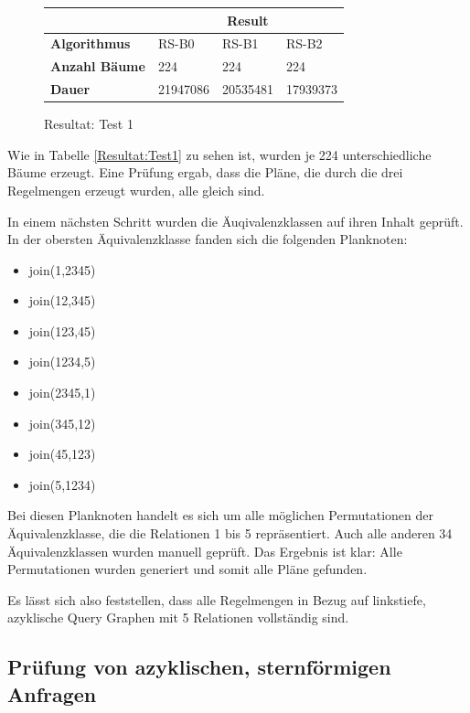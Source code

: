 \begin{figure}[ht]
\centering

\begin{tabular}{|l|l|l|l|}
\hline
                         & \multicolumn{3}{c|}{{\bf Result}} \\ \hline
{\bf Algorithmus}        & RS-B0     & RS-B1     & RS-B2     \\ \hline
{\bf Anzahl Bäume}       & 224       & 224       & 224       \\ \hline
{\bf Dauer}              & 21947086  & 20535481  & 17939373  \\ \hline
\end{tabular}

\caption{Resultat: Test 1}
\label{Result:Test1}
\end{figure}

Wie in Tabelle \ref{Resultat:Test1} zu sehen ist, wurden je 224 unterschiedliche Bäume erzeugt. Eine Prüfung ergab, dass die Pläne, die durch die drei Regelmengen erzeugt wurden, alle gleich sind.

In einem nächsten Schritt wurden die Äuqivalenzklassen auf ihren Inhalt geprüft. In der obersten Äquivalenzklasse fanden sich die folgenden Planknoten:

\begin{itemize}
\item join(1,2345)
\item join(12,345)
\item join(123,45)
\item join(1234,5)
\item join(2345,1)
\item join(345,12)
\item join(45,123)
\item join(5,1234)
\end{itemize}

Bei diesen Planknoten handelt es sich um alle möglichen Permutationen der Äquivalenzklasse, die die Relationen 1 bis 5 repräsentiert. Auch alle anderen 34 Äquivalenzklassen wurden manuell geprüft. Das Ergebnis ist klar: Alle Permutationen wurden generiert und somit alle Pläne gefunden.

Es lässt sich also feststellen, dass alle Regelmengen in Bezug auf linkstiefe, azyklische Query Graphen mit 5 Relationen vollständig sind.

\subsection{Prüfung von azyklischen, sternförmigen Anfragen}

